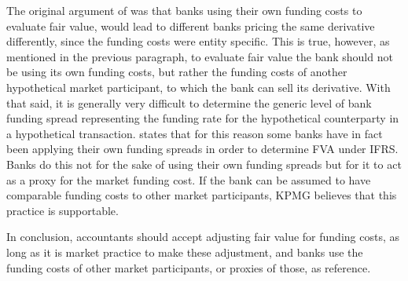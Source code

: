 \documentclass[../../../main.tex]{subfiles}
\begin{document}
            The original argument of \textcite{HullWhiteFVA} was that banks using their own funding costs to evaluate fair value,
            would lead to different banks pricing the same derivative differently,
            since the funding costs were entity specific.
            This is true, however, as mentioned in the previous paragraph,
            to evaluate fair value the bank should not be using its own funding costs, 
            but rather the funding costs of another hypothetical market participant, 
            to which the bank can sell its derivative.
            With that said, it is generally very difficult to determine the generic level of bank funding spread
            representing the funding rate for the hypothetical counterparty in a hypothetical transaction.
            \textcite[Proposition 4]{KPMGFVA} states that for this reason 
            some banks have in fact been applying their own funding spreads in order to determine FVA under IFRS. 
            Banks do this not for the sake of using their own funding spreads
            but for it to act as a proxy for the market funding cost.
            If the bank can be assumed to have comparable funding costs to other market participants,
            KPMG believes that this practice is supportable.

            In conclusion, accountants should accept adjusting fair value for funding costs,
            as long as it is market practice to make these adjustment,
            and banks use the funding costs of other market participants, or proxies of those, as reference.
\end{document}
